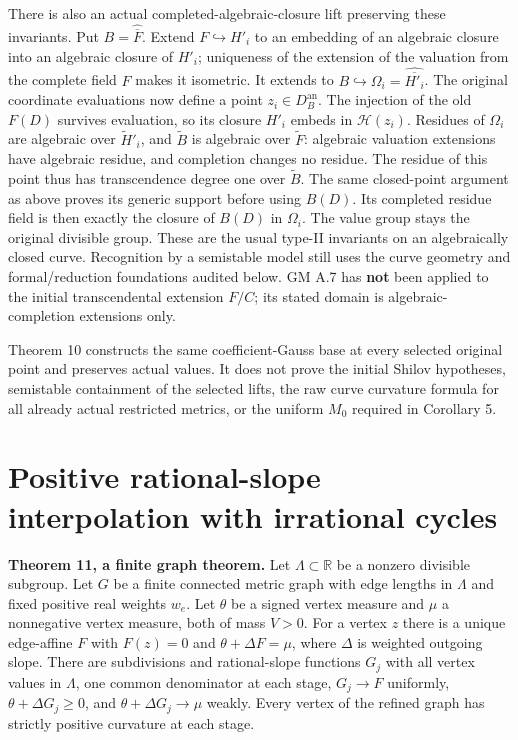 \documentclass[
  11pt,
]{article}
\begin{document}
There is also an actual completed-algebraic-closure lift preserving
these invariants. Put \(B=\widehat{\overline F}\). Extend
\(F\hookrightarrow H'_i\) to an embedding of an algebraic closure into
an algebraic closure of \(H'_i\); uniqueness of the extension of the
valuation from the complete field \(F\) makes it isometric. It extends
to \(B\hookrightarrow\Omega_i=\widehat{\overline{H'_i}}\). The original
coordinate evaluations now define a point \(z_i\in D_B^{\mathrm{an}}\).
The injection of the old \(F(D)\) survives evaluation, so its closure
\(H'_i\) embeds in \(\mathcal H(z_i)\). Residues of \(\Omega_i\) are
algebraic over \(\widetilde H'_i\), and \(\widetilde B\) is algebraic
over \(\widetilde F\): algebraic valuation extensions have algebraic
residue, and completion changes no residue. The residue of this point
thus has transcendence degree one over \(\widetilde B\). The same
closed-point argument as above proves its generic support before using
\(B(D)\). Its completed residue field is then exactly the closure of
\(B(D)\) in \(\Omega_i\). The value group stays the original divisible
group. These are the usual type-II invariants on an algebraically closed
curve. Recognition by a semistable model still uses the curve geometry
and formal/reduction foundations audited below. GM A.7 has \textbf{not}
been applied to the initial transcendental extension \(F/C\); its stated
domain is algebraic-completion extensions only.

Theorem 10 constructs the same coefficient-Gauss base at every selected
original point and preserves actual values. It does not prove the
initial Shilov hypotheses, semistable containment of the selected lifts,
the raw curve curvature formula for all already actual restricted
metrics, or the uniform \(M_0\) required in Corollary 5.

\section{Positive rational-slope interpolation with irrational
cycles}\label{positive-rational-slope-interpolation-with-irrational-cycles}

\textbf{Theorem 11, a finite graph theorem.} Let
\(\Lambda\subset\mathbb R\) be a nonzero divisible subgroup. Let \(G\)
be a finite connected metric graph with edge lengths in \(\Lambda\) and
fixed positive real weights \(w_e\). Let \(\theta\) be a signed vertex
measure and \(\mu\) a nonnegative vertex measure, both of mass \(V>0\).
For a vertex \(z\) there is a unique edge-affine \(F\) with \(F(z)=0\)
and \(\theta+\Delta F=\mu\), where \(\Delta\) is weighted outgoing
slope. There are subdivisions and rational-slope functions \(G_j\) with
all vertex values in \(\Lambda\), one common denominator at each stage,
\(G_j\to F\) uniformly, \(\theta+\Delta G_j\geq0\), and
\(\theta+\Delta G_j\to\mu\) weakly. Every vertex of the refined graph
has strictly positive curvature at each stage.
\end{document}
